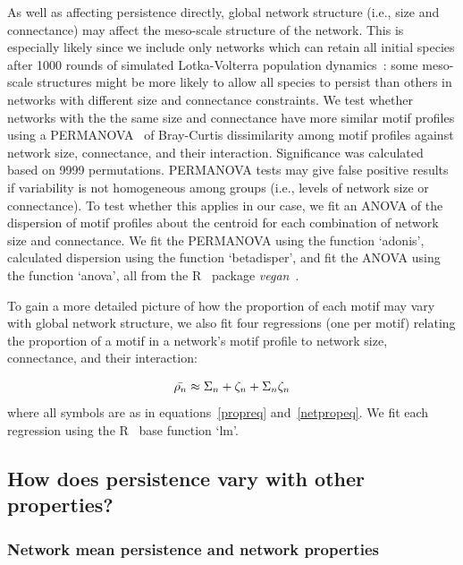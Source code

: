 \documentclass[12pt]{article}
\begin{document}
\begin{spacing}{2.0}
        As well as affecting persistence directly, global network structure (i.e., size and connectance) may affect the meso-scale structure of the network.
        This is especially likely since we include only networks which can retain all initial species after 1000 rounds of simulated Lotka-Volterra population dynamics~\citep{Cirtwill2021_inprep}:  some meso-scale structures might be more likely to allow all species to persist than others in networks with different size and connectance constraints.
        We test whether networks with the the same size and connectance have more similar motif profiles using a PERMANOVA~\citep{Anderson2001} of Bray-Curtis dissimilarity among motif profiles against network size, connectance, and their interaction.
        Significance was calculated based on 9999 permutations.
        PERMANOVA tests may give false positive results if variability is not homogeneous among groups (i.e., levels of network size or connectance).
        To test whether this applies in our case, we fit an ANOVA of the dispersion of motif profiles about the centroid for each combination of network size and connectance. 
        We fit the PERMANOVA using the function `adonis', calculated dispersion using the function `betadisper', and fit the ANOVA using the function `anova', all from the R~\citep{R} package \emph{vegan}~\citep{vegan}.


        To gain a more detailed picture of how the proportion of each motif may vary with global network structure, we also fit four regressions (one per motif) relating the proportion of a motif in a network's motif profile to network size, connectance, and their interaction:

        \begin{equation}
            \Bar{\rho_{n}} \approx \Sigma_{n} + \zeta_{n} + \Sigma_{n}\zeta_{n}
        \end{equation}
        where all symbols are as in equations~\ref{propreq} and~\ref{netpropeq}.
        We fit each regression using the R~\citep{R} base function `lm'.
            

    \subsection{How does persistence vary with other properties?}

        \subsubsection{Network mean persistence and network properties}
    

\end{spacing}
\end{document}
